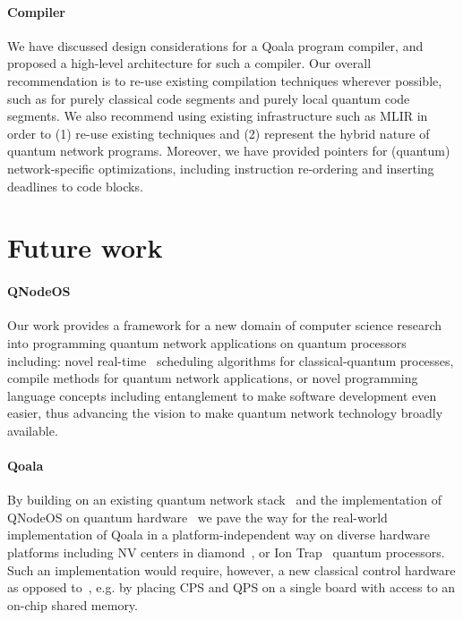 \paragraph{Compiler}
We have discussed design considerations for a Qoala program compiler, and proposed a high-level architecture for such a compiler.
Our overall recommendation is to re-use existing compilation techniques wherever possible, such as for purely classical code segments and purely local quantum code segments.
We also recommend using existing infrastructure such as MLIR in order to (1) re-use existing techniques and (2) represent the hybrid nature of quantum network programs.
Moreover, we have provided pointers for (quantum) network-specific optimizations, including instruction re-ordering and inserting deadlines to code blocks.

\section{Future work}


\paragraph{QNodeOS}
Our work provides a framework for a new domain of computer science research into programming quantum network applications on quantum processors including: novel real-time~\cite{ramamritham_scheduling_1994} scheduling algorithms for classical-quantum processes, compile methods for quantum network applications, or novel programming language concepts including entanglement to make software development even easier, thus advancing the vision to make quantum network technology broadly available.


\paragraph{Qoala}
By building on an existing quantum network stack~\cite{dahlberg2019link, pompili2022experimental} and the implementation of QNodeOS on quantum hardware~\cite{pompili2022experimental, carlothesis} we pave the way for the real-world implementation of Qoala in a platform-independent way on diverse hardware platforms including NV centers in diamond~\cite{pompili2021realization, pompili2022experimental}, or Ion Trap~\cite{krutyanskiy2023entanglement,krutyanskiy2023telecom} quantum processors. 
Such an implementation would require, however, a new classical control hardware as opposed to~\cite{pompili2022experimental, carlothesis}, e.g. by placing CPS and QPS on a single board with access to an on-chip shared memory. 

